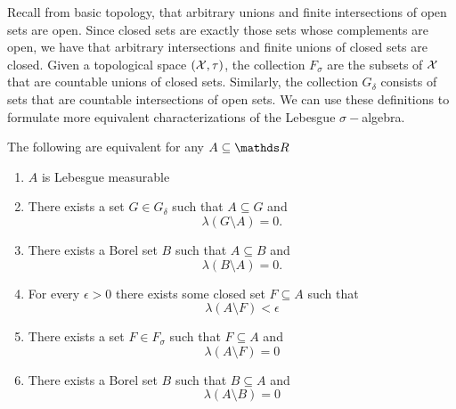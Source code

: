 Recall from basic topology, that arbitrary unions and finite intersections
of open sets are open. Since closed sets are exactly those sets whose
complements are open, we have that arbitrary intersections and finite
unions of closed sets are closed. Given a topological space $\left(\mathcal{X},\tau\right)$,
the collection $F_{\sigma}$ are the subsets of $\mathcal{X}$ that are countable
unions of closed sets. Similarly, the collection $G_{\delta}$ consists
of sets that are countable intersections of open sets. We can use
these definitions to formulate more equivalent characterizations of
the Lebesgue $\sigma-$algebra.
\begin{prop}
\label{prop:equivalentLebesgueMeasurability}The following are equivalent
for any $A\subseteq\R$

\begin{enumerate}[label=(\roman*),leftmargin=.1\linewidth,rightmargin=.4\linewidth]
\item $A$ is Lebesgue measurable
\item There exists a set  $G \in G_{\delta}$ such that $A \subseteq G$ and 
\[
	\lambda\left(G\setminus A\right) = 0.
\]
\item There exists a Borel set $B$ such that $A \subseteq B$ and 
\[
	\lambda\left(B\setminus A\right) = 0.
\]
\item For every $\epsilon > 0$ there exists some closed set $F \subseteq A$ such that 
\[
	\lambda\left(A \setminus F\right) < \epsilon
\]
\item There exists a set $F \in F_{\sigma}$ such that $F \subseteq A$ and 
\[
	\lambda\left(A\setminus F\right)= 0
\]
\item There exists a Borel set $B$ such that $B\subseteq A$ and 
\[
	\lambda\left(A\setminus B\right) = 0
\]
\end{enumerate}
\end{prop}

